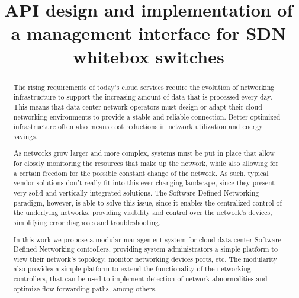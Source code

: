 \documentclass[a4paper]{IEEEtran}
\begin{document}
\title{API design and implementation of a management interface for SDN whitebox switches}

\author{%
%
%
}
\maketitle


\begin{abstract}
The rising requirements of today's cloud services require the evolution of networking infrastructure to support the increasing amount of data that is processed
every day. This means that data center network operators must design or adapt their cloud networking environments to provide a stable and reliable connection.
Better optimized infrastructure often also means cost reductions in network utilization and energy savings.

\par As networks grow larger and more complex, systems must be put in place that allow for closely monitoring the resources that make up the network, while also 
allowing for a certain freedom for the possible constant change of the network. As such, typical vendor solutions don't really fit into this ever changing landscape,
since they present very solid and vertically integrated solutions. The Software Defined Networking paradigm, however, is able to solve this issue, since it enables
the centralized control of the underlying networks, providing visibility and control over the network's devices, simplifying error diagnosis and troubleshooting. 

\par In this work we propose a modular management system for cloud data center Software Defined Networking controllers, providing system administrators a simple
platform to view their network's topology, monitor networking devices ports, etc. The modularity also provides a simple platform to extend the functionality 
of the networking controllers, that can be used to implement detection of network abnormalities and optimize flow forwarding paths, among others.
\end{abstract}
\end{document}
